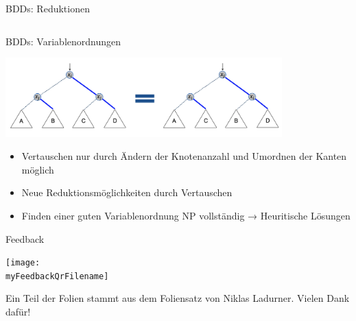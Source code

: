 \documentclass[
  german,            %
  aspectratio=169,    %
]{tumbeamer}
\begin{document}
\begin{frame}[c, fragile]{BDDs: Reduktionen}
\begin{columns}[c]
\begin{column}{0.5\textwidth}
\begin{center}
{
		}
	\end{center}
\end{column}
\end{columns}
\end{frame}

\begin{frame}[c, fragile]{BDDs: Variablenordnungen}
	\begin{center}
		\includegraphics[width=0.8\textwidth]{w12_BDD_Variablenordnungen.png}
	\end{center}
	\begin{itemize}
		\item Vertauschen nur durch Ändern der Knotenanzahl und Umordnen der Kanten möglich
		\item Neue Reduktionsmöglichkeiten durch Vertauschen
		\item Finden einer guten Variablenordnung NP vollständig → Heuritische Lösungen
	\end{itemize}
\end{frame}

\begin{frame}[c]{Feedback}{} 
  \begin{center}
    \texttt{[image: \\myFeedbackQrFilename]}
  \end{center}
  \begin{center}
    \LARGE \href{\myFeedbackLink}{\myFeedbackLink}
  \end{center}
  \vspace{0.5cm}
  \begin{center}
    \small Ein Teil der Folien stammt aus dem Foliensatz von Niklas Ladurner. Vielen Dank dafür!
  \end{center}
\end{frame}
\end{document}
